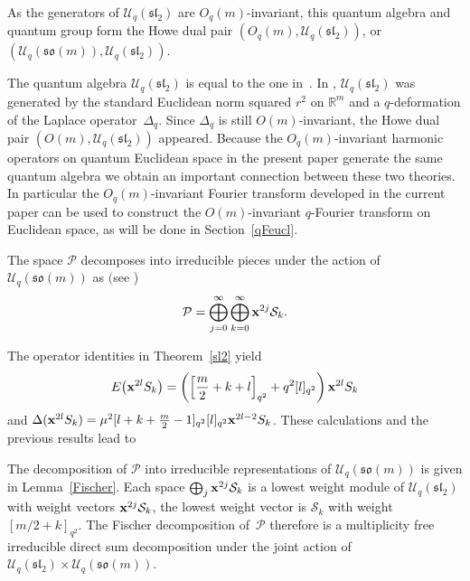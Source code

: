\documentclass[pdftex]{sigma}
\newcommand{\mR}{\mathbb{R}}
\newcommand{\cP}{\mathcal{P}}
\newcommand{\cS}{\mathcal{S}}
\newcommand{\cU}{\mathcal{U}}
\numberwithin{equation}{section}
\begin{document}
\begin{remark}
As the generators of $\cU_q(\mathfrak{sl}_2)$ are $O_q(m)$-invariant, this quantum algebra and quantum group form the Howe dual pair $(O_q(m),\cU_q(\mathfrak{sl}_2))$, or $(\cU_q(\mathfrak{so}(m)),\cU_q(\mathfrak{sl}_2))$.
\end{remark}

The quantum algebra $\cU_q(\mathfrak{sl}_2)$ is equal to the one in~\cite{MR2595267}. In \cite{MR2595267}, $\cU_q(\mathfrak{sl}_2)$ was generated by the standard Euclidean norm squared $r^2$ on $\mR^m$ and a $q$-deformation of the Laplace operator~$\Delta_q$. Since $\Delta_q$ is still $O(m)$-invariant, the Howe dual pair $(O(m),\cU_q(\mathfrak{sl}_2))$ appeared. Because the $O_q(m)$-invariant harmonic operators on quantum Euclidean space in the present paper generate the same quantum algebra we obtain an important connection between these two theories. In particular the $O_q(m)$-invariant Fourier transform developed in the current paper can be used to construct the $O(m)$-invariant $q$-Fourier transform on Euclidean space, as will be done in Section~\ref{qFeucl}.

\begin{lemma}
\label{Fischer}
The space $\cP$ decomposes into irreducible pieces under the action of $\cU_q(\mathfrak{so}(m))$ as $($see {\rm \cite{MR2006509, MR1328733})}
\begin{gather*}
\cP=\bigoplus_{j=0}^{\infty}\bigoplus_{k=0}^\infty\bold{x}^{2j}\cS_{k}.
\end{gather*}
\end{lemma}


The operator identities in Theorem~\ref{sl2} yield
\begin{gather*}
E\big(\bold{x}^{2l}S_k\big)=\left(\left[\frac{m}{2}+k+l\right]_{q^2}+q^2[l]_{q^2}\right)\bold{x}^{2l}S_k
\end{gather*}
and $\Delta(\bold{x}^{2l}S_k)=\mu^2[l+k+\frac{m}{2}-1]_{q^2}[l]_{q^2}\bold{x}^{2l-2}S_k$. These calculations and the previous results lead to
\begin{theorem}\sloppy
The decomposition of $\cP$ into irreducible representations of $\cU_q(\mathfrak{so}(m))$ is given in Lemma~{\rm \ref{Fischer}}. Each space $\bigoplus_j \bold{x}^{2j}\cS_k$ is a lowest weight module of $\cU_q(\mathfrak{sl}_2)$ with weight vectors $\bold{x}^{2j}\cS_k$, the lowest weight vector is $\cS_k$ with weight $[m/2+k]_{q^2}$. The Fischer decomposition of~$\cP$ therefore is a multiplicity free irreducible direct sum decomposition under the joint action of $\cU_q(\mathfrak{sl}_2)\times\cU_q(\mathfrak{so}(m))$.
\end{theorem}
\end{document}
